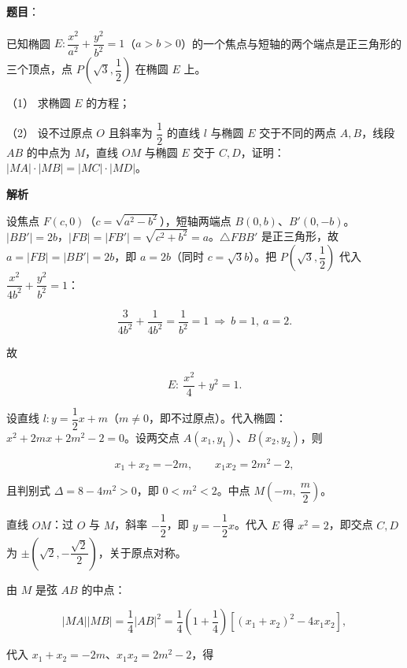 \begin{answer}

\textbf{题目}：

已知椭圆 \(E:\dfrac{x^{2}}{a^{2}}+\dfrac{y^{2}}{b^{2}}=1\)（\(a>b>0\)）的一个焦点与短轴的两个端点是正三角形的三个顶点，点 \(P\left(\sqrt{3},\dfrac{1}{2}\right)\) 在椭圆 \(E\) 上。

（1） 求椭圆 \(E\) 的方程；

（2） 设不过原点 \(O\) 且斜率为 \(\dfrac{1}{2}\) 的直线 \(l\) 与椭圆 \(E\) 交于不同的两点 \(A,B\)，线段 \(AB\) 的中点为 \(M\)，直线 \(OM\) 与椭圆 \(E\) 交于 \(C,D\)，证明：\(|MA|\cdot|MB|=|MC|\cdot|MD|\)。

\textbf{解析}


设焦点 \(F(c,0)\)（\(c=\sqrt{a^{2}-b^{2}}\)），短轴两端点 \(B(0,b)\)、\(B'(0,-b)\)。\(|BB'|=2b\)，\(|FB|=|FB'|=\sqrt{c^{2}+b^{2}}=a\)。\(\triangle FBB'\) 是正三角形，故 \(a=|FB|=|BB'|=2b\)，即 \(a=2b\)（同时 \(c=\sqrt{3}b\)）。把 \(P\left(\sqrt{3},\dfrac{1}{2}\right)\) 代入 \(\dfrac{x^{2}}{4b^{2}}+\dfrac{y^{2}}{b^{2}}=1\)：

\nopagebreak[4]
\[
\frac{3}{4b^{2}}+\frac{1}{4b^{2}}=\frac{1}{b^{2}}=1\ \Longrightarrow\ b=1,\ a=2.
\]

故

\nopagebreak[4]
\[
E:\ \frac{x^{2}}{4}+y^{2}=1.
\]


设直线 \(l:y=\dfrac{1}{2}x+m\)（\(m\neq0\)，即不过原点）。代入椭圆：\(x^{2}+2mx+2m^{2}-2=0\)。设两交点 \(A(x_1,y_1)\)、\(B(x_2,y_2)\)，则

\nopagebreak[4]
\[
x_1+x_2=-2m,\qquad x_1x_2=2m^{2}-2,
\]

且判别式 \(\Delta=8-4m^{2}>0\)，即 \(0<m^{2}<2\)。中点 \(M\left(-m,\ \dfrac{m}{2}\right)\)。

直线 \(OM\)：过 \(O\) 与 \(M\)，斜率 \(-\dfrac{1}{2}\)，即 \(y=-\dfrac{1}{2}x\)。代入 \(E\) 得 \(x^{2}=2\)，即交点 \(C,D\) 为 \(\pm\left(\sqrt{2},-\dfrac{\sqrt{2}}{2}\right)\)，关于原点对称。

由 \(M\) 是弦 \(AB\) 的中点：

\nopagebreak[4]
\[
|MA||MB|=\frac{1}{4}|AB|^{2}=\frac{1}{4}\left(1+\frac{1}{4}\right)\left[(x_1+x_2)^{2}-4x_1x_2\right],
\]

代入 \(x_1+x_2=-2m\)、\(x_1x_2=2m^{2}-2\)，得


\end{answer}
